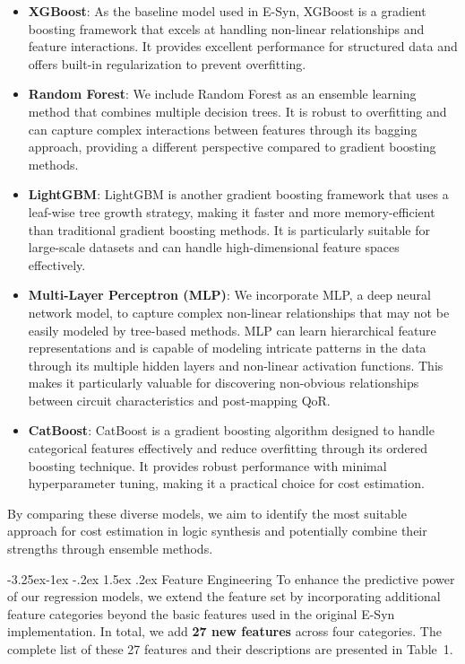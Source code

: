 \documentclass[10pt,twocolumn]{article}
\makeatletter
\renewcommand\subsection{\@startsection{subsection}{2}{\z@}%
                                     {-3.25ex\@plus -1ex \@minus -.2ex}%
                                     {1.5ex \@plus .2ex}%
                                     {\normalfont\normalsize\bfseries}}
\makeatother
\begin{document}
\begin{itemize}
\item \textbf{XGBoost}: As the baseline model used in E-Syn, XGBoost is a gradient boosting framework that excels at handling non-linear relationships and feature interactions. It provides excellent performance for structured data and offers built-in regularization to prevent overfitting.

\item \textbf{Random Forest}: We include Random Forest as an ensemble learning method that combines multiple decision trees. It is robust to overfitting and can capture complex interactions between features through its bagging approach, providing a different perspective compared to gradient boosting methods.

\item \textbf{LightGBM}: LightGBM is another gradient boosting framework that uses a leaf-wise tree growth strategy, making it faster and more memory-efficient than traditional gradient boosting methods. It is particularly suitable for large-scale datasets and can handle high-dimensional feature spaces effectively.

\item \textbf{Multi-Layer Perceptron (MLP)}: We incorporate MLP, a deep neural network model, to capture complex non-linear relationships that may not be easily modeled by tree-based methods. MLP can learn hierarchical feature representations and is capable of modeling intricate patterns in the data through its multiple hidden layers and non-linear activation functions. This makes it particularly valuable for discovering non-obvious relationships between circuit characteristics and post-mapping QoR.

\item \textbf{CatBoost}: CatBoost is a gradient boosting algorithm designed to handle categorical features effectively and reduce overfitting through its ordered boosting technique. It provides robust performance with minimal hyperparameter tuning, making it a practical choice for cost estimation.
\end{itemize}

By comparing these diverse models, we aim to identify the most suitable approach for cost estimation in logic synthesis and potentially combine their strengths through ensemble methods.

\subsection{Feature Engineering}
To enhance the predictive power of our regression models, we extend the feature set by incorporating additional feature categories beyond the basic features used in the original E-Syn implementation. In total, we add \textbf{27 new features} across four categories. The complete list of these 27 features and their descriptions are presented in Table~1.
\end{document}
